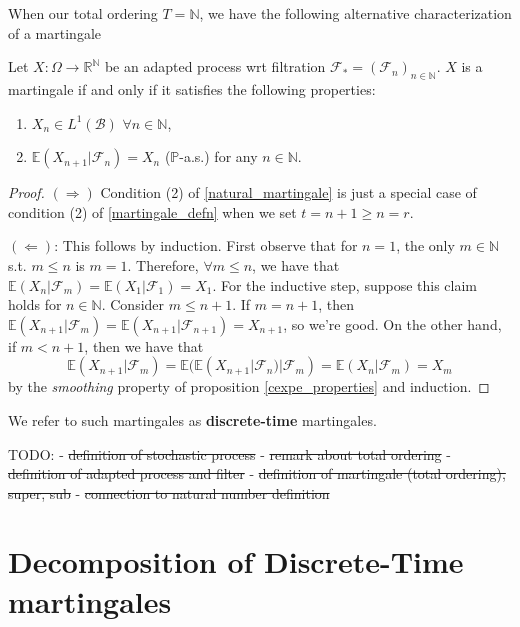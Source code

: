 When our total ordering \(T = \mathbb{N}\), we have the following alternative characterization of a martingale
\begin{proposition}
    \label{natural_martingale}
    Let $X: \Omega \to \mathbb{R}^{\mathbb{N}}$ be an adapted process wrt filtration $\mathcal{F}_{*} = (\mathcal{F}_{n})_{n \in \mathbb{N}}$. $X$ is a martingale if and only if it satisfies the following properties:
    \begin{enumerate}
        \item $X_{n} \in L^{1}(\mathcal{B})$ $\forall n \in \mathbb{N}$,
        \item $\mathbb{E}(X_{n+1} | \mathcal{F}_{n}) = X_{n}$ (\(\mathbb{P}\)-a.s.) for any $n \in \mathbb{N}$.
    \end{enumerate}
\end{proposition}

\begin{proof}
    \((\Rightarrow)\) Condition (2) of \ref{natural_martingale} is just a special case of condition (2) of \ref{martingale_defn} when we set \(t = n+1 \geq n = r\).

    \((\Leftarrow)\): This follows by induction. First observe that for $n = 1$, the only $m \in \mathbb{N}$ s.t. $m \leq n$ is $m = 1$. Therefore, $\forall m \leq n$, we have that $\mathbb{E}(X_{n} | \mathcal{F}_{m}) = \mathbb{E}(X_{1} | \mathcal{F}_{1}) = X_{1}$. For the inductive step, suppose this claim holds for $n \in \mathbb{N}$. Consider $m \leq n+1$. If \(m = n+1\), then \(\mathbb{E}(X_{n+1} | \mathcal{F}_{m}) = \mathbb{E}(X_{n+1} | \mathcal{F}_{n+1}) = X_{n+1}\), so we're good. On the other hand, if \(m < n+1\), then we have that $$\mathbb{E}(X_{n+1} | \mathcal{F}_{m}) = \mathbb{E}(\mathbb{E}(X_{n+1} | \mathcal{F}_{n}) | \mathcal{F}_{m}) = \mathbb{E}(X_{n} | \mathcal{F}_{m}) = X_{m}$$ by the \textit{smoothing} property of proposition \ref{cexpe_properties} and induction.
\end{proof}

We refer to such martingales as \textbf{discrete-time} martingales.

TODO:
- \st{definition of stochastic process}
- \st{remark about total ordering}
- \st{definition of adapted process and filter}
- \st{definition of martingale (total ordering), super, sub}
- \st{connection to natural number definition}

\section{Decomposition of Discrete-Time martingales}

